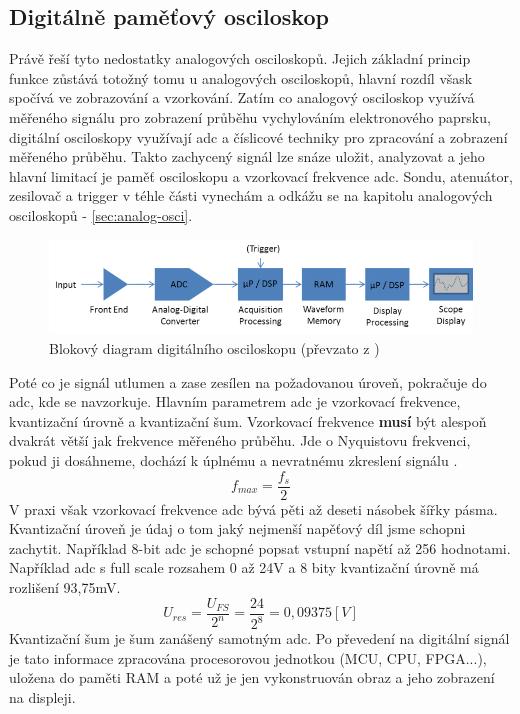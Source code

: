 \documentclass[12pt]{article}
\begin{document}
\subsection{Digitálně paměťový osciloskop}

Právě  řeší tyto nedostatky analogových osciloskopů. Jejich základní princip
funkce zůstává totožný tomu u analogových osciloskopů, hlavní rozdíl všask spočívá ve zobrazování
a vzorkování. Zatím co analogový osciloskop využívá měřeného signálu pro zobrazení průběhu
vychylováním elektronového paprsku, digitální osciloskopy využívají \acrfull{adc} a
číslicové techniky pro zpracování a zobrazení měřeného průběhu. Takto zachycený signál
lze snáze uložit, analyzovat a jeho hlavní limitací je paměť osciloskopu a vzorkovací frekvence
\acrshort{adc}. Sondu, atenuátor, zesilovač a trigger v téhle části vynechám a odkážu se na
kapitolu analogových osciloskopů - \ref{sec:analog-osci}.

\begin{figure}[h]
    \centering
    \includegraphics[width=\textwidth]{digital-oscilloscope-diagram}
    \caption{Blokový diagram digitálního osciloskopu (převzato z \cite{SampleProcessingDigital})}
    \label{fig:blok-digital-osci}
\end{figure}

Poté co je signál utlumen
a zase zesílen na požadovanou úroveň, pokračuje do \acrshort{adc}, kde se navzorkuje.
Hlavním parametrem \acrshort{adc} je vzorkovací frekvence, kvantizační úrovně a kvantizační
šum. Vzorkovací frekvence \textbf{musí} být alespoň dvakrát větší jak frekvence měřeného
průběhu. Jde o Nyquistovu frekvenci, pokud ji dosáhneme, dochází k úplnému a nevratnému
zkreslení signálu \cite{AliasingADCsNot2015}. $$f_{max}=\frac{f_s}{2}$$ V praxi však vzorkovací
frekvence \acrshort{adc} bývá pěti až deseti násobek šířky pásma. Kvantizační úroveň je údaj
o tom jaký nejmenší napěťový díl jsme schopni zachytit. Například 8-bit \acrshort{adc} je
schopné popsat vstupní napětí až 256 hodnotami. Například \acrshort{adc} s full scale rozsahem
0 až 24V a 8 bity kvantizační úrovně má rozlišení 93,75mV.
$$U_{res}=\frac{U_{FS}}{2^n}=\frac{24}{2^8}=0, 09375 [V]$$ Kvantizační šum je šum zanášený
samotným \acrshort{adc}. Po převedení na digitální signál je tato informace zpracována
procesorovou jednotkou (MCU, CPU, FPGA...), uložena do paměti RAM a poté už je jen vykonstruován
obraz a jeho zobrazení na displeji.
\end{document}
